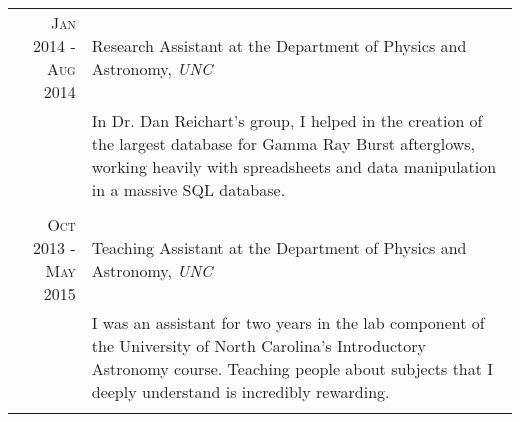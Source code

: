 \documentclass[a4paper,10pt]{article} %
\begin{document}
\begin{tabular}{r|p{11cm}}

\textsc{Jan 2014 - Aug 2014} & Research Assistant at the Department of Physics and Astronomy, \emph{UNC} \\ 
& \footnotesize{In Dr. Dan Reichart's group, I helped in the creation of the largest database for Gamma Ray Burst afterglows, working heavily with spreadsheets and data manipulation in a massive SQL database.}\\
\multicolumn{2}{c}{} \\


\textsc{Oct 2013 - May 2015} & Teaching Assistant at the Department of Physics and Astronomy, \emph{UNC} \\
& \footnotesize{I was an assistant for two years in the lab component of the University of North Carolina's Introductory Astronomy course. Teaching people about subjects that I deeply understand is incredibly rewarding.}\\
\multicolumn{2}{c}{} \\



\end{tabular}
\end{document}
